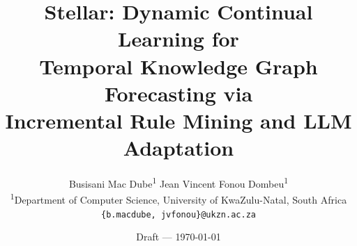 \documentclass[10pt,twocolumn]{article}
\theoremstyle{definition}
\begin{document}
\title{%
  \large\bfseries
  Stellar: Dynamic Continual Learning for\\
  Temporal Knowledge Graph Forecasting via\\
  Incremental Rule Mining and LLM Adaptation%
}

\author{
  Busisani Mac Dube\textsuperscript{1} \quad Jean Vincent Fonou Dombeu\textsuperscript{1}\\[4pt]
  \textsuperscript{1}Department of Computer Science, University of KwaZulu-Natal, South Africa\\[2pt]
  \small\texttt{\{b.macdube, jvfonou\}@ukzn.ac.za}
}

\date{\small Draft — \today{} }

\maketitle
\thispagestyle{empty}
\end{document}
